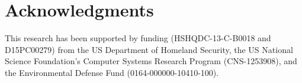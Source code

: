 \section*{Acknowledgments}
This research has been supported by funding (HSHQDC-13-C-B0018 and D15PC00279) from the US Department of Homeland Security, the US National Science Foundation's Computer Systems Research Program (CNS-1253908), and the Environmental Defense Fund (0164-000000-10410-100). \\
